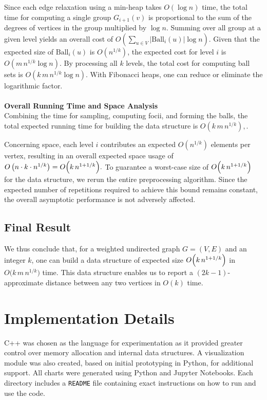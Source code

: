 \documentclass{article}
\begin{document}
Since each edge relaxation using a min-heap takes \(O(\log n)\) time, the total time for computing a single group \(G_{i+1}(v)\) is proportional to the sum of the degrees of vertices in the group multiplied by \(\log n\). Summing over all group at a given level yields an overall cost of
\(
O\left(\sum_{u \in V} |\text{Ball}_i(u)| \log n\right).
\)
Given that the expected size of \(\text{Ball}_i(u)\) is \(O(n^{1/k})\), the expected cost for level \(i\) is \(O(m\,n^{1/k}\log n)\). By processing all \(k\) levels, the total cost for computing ball sets is \(O(k\,m\,n^{1/k}\log n)\). With Fibonacci heaps, one can reduce or eliminate the logarithmic factor.
\\\\
\textbf{Overall Running Time and Space Analysis}\\
Combining the time for sampling, computing focii, and forming the balls, the total expected running time for building the data structure is
\({O}(k\,m\,n^{1/k}),
\).

Concerning space, each level \(i\) contributes an expected \(O(n^{1/k})\) elements per vertex, resulting in an overall expected space usage of
\(
O\left(n \cdot k \cdot n^{1/k}\right) = O\Bigl(k\,n^{1+1/k}\Bigr).
\)
To guarantee a worst-case size of \(O\Bigl(k\,n^{1+1/k}\Bigr)\) for the data structure, we rerun the entire preprocessing algorithm. Since the expected number of repetitions required to achieve this bound remains constant, the overall asymptotic performance is not adversely affected.

\subsection{Final Result}
We thus conclude that, for a weighted undirected graph \(G=(V,E)\) and an integer \(k\), one can build a data structure of expected size \(O\Bigl(k\,n^{1+1/k}\Bigr)\) in \(O\bigl(k\,m\,n^{1/k}\bigr)\) time. This data structure enables us to report a \((2k-1)\)-approximate distance between any two vertices in \(O(k)\) time.

\section{Implementation Details}

C++ was chosen as the language for experimentation as it provided greater control over memory allocation and internal data structures. A visualization module was also created, based on initial prototyping in Python, for additional support. All charts were generated using Python and Jupyter Notebooks. Each directory includes a \texttt{README} file containing exact instructions on how to run and use the code.
\end{document}
